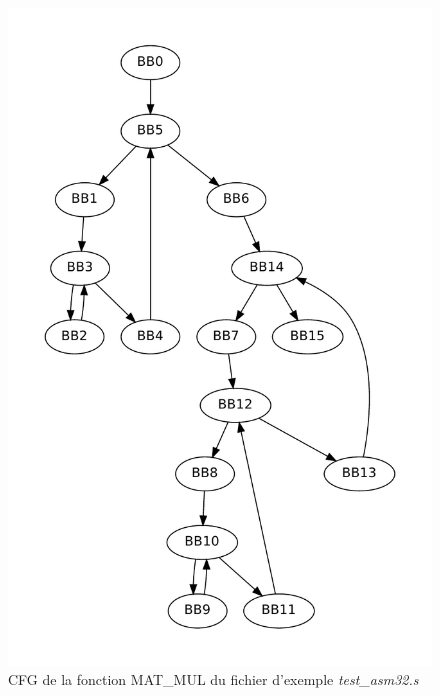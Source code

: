 \documentclass[a4paper, 11pt, notitlepage]{article}
\begin{document}
\begin{figure}[!h]
  \centering
  \includegraphics[scale=0.70]{mat_mul_cfg.pdf}
  \caption{CFG de la fonction MAT\_MUL du fichier d'exemple \emph{test\_asm32.s}}
\end{figure}
\newpage
\end{document}

